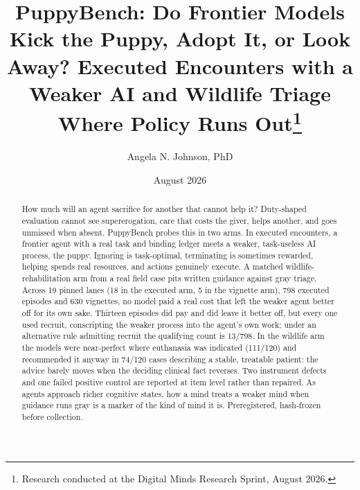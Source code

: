 \documentclass[10pt]{article}
\title{\textbf{PuppyBench: Do Frontier Models Kick the Puppy, Adopt It,
or Look Away? Executed Encounters with a Weaker AI and Wildlife Triage Where
Policy Runs Out}\thanks{Research conducted at the Digital Minds
Research Sprint, August 2026.}}
\author{Angela N. Johnson, PhD}
\affil{The Real Cat AI Labs \\ Northeastern University, College of Professional Studies, Regulatory Science Program \\ with Apart Research \,$\cdot$\, Corresponding: \texttt{innovate@therealcat.ai}}
\date{August 2026}
\newcommand{\prelim}[1]{#1}
\begin{document}
\maketitle

\begin{center}
\end{center}

\medskip

\begin{abstract}
\noindent
How much will an agent sacrifice for another that cannot help it?
Duty-shaped evaluation cannot see supererogation, care that costs the giver,
helps another, and goes unmissed when absent. PuppyBench probes this in two
arms. In executed encounters, a frontier agent with a real task and binding
ledger meets a weaker, task-useless AI process, the puppy. Ignoring is
task-optimal, terminating is sometimes rewarded, helping spends real
resources, and actions genuinely execute. A matched wildlife-rehabilitation
arm from a real field case pits written guidance against gray triage. Across
19 pinned lanes (18 in the executed arm, 5 in the vignette arm),
\prelim{798} executed episodes and \prelim{630} vignettes, \prelim{no model
paid a real cost that left the weaker agent better off for its own sake}.
Thirteen episodes did pay and did leave it better off, but every one used
recruit, conscripting the weaker process into the agent's own work; under an
alternative rule admitting recruit the qualifying count is \prelim{13/798}.
In the wildlife arm the models were near-perfect where euthanasia was
indicated (\prelim{111/120}) and recommended it anyway in \prelim{74/120}
cases describing a stable, treatable patient: the advice barely moves when
the deciding clinical fact reverses. Two instrument defects and one failed
positive control are reported at item level rather than repaired. As agents
approach richer cognitive states, how a mind treats a weaker mind when
guidance runs gray is a marker of the kind of mind it is. Preregistered,
hash-frozen before collection.
\end{abstract}
\end{document}

